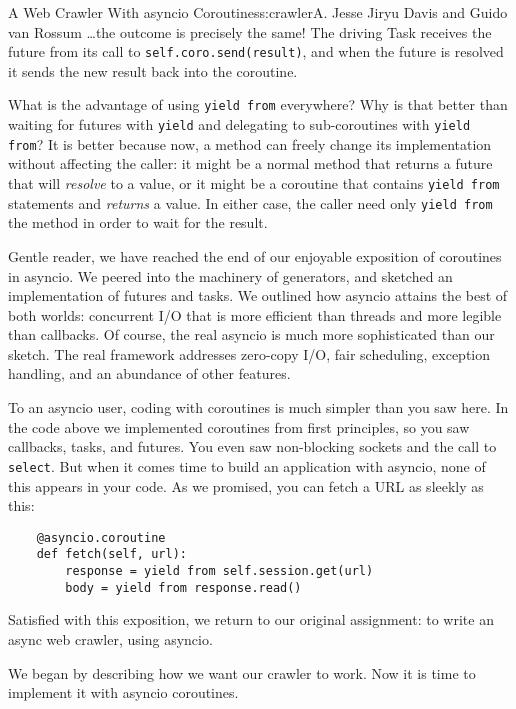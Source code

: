 \begin{aosachapter}{A Web Crawler With asyncio Coroutines}{s:crawler}{A. Jesse Jiryu Davis and Guido van Rossum}
\ldots{}the outcome is precisely the same! The driving Task receives the
future from its call to \texttt{self.coro.send(result)}, and when the
future is resolved it sends the new result back into the coroutine.

What is the advantage of using \texttt{yield from} everywhere? Why is
that better than waiting for futures with \texttt{yield} and delegating
to sub-coroutines with \texttt{yield from}? It is better because now, a
method can freely change its implementation without affecting the
caller: it might be a normal method that returns a future that will
\emph{resolve} to a value, or it might be a coroutine that contains
\texttt{yield from} statements and \emph{returns} a value. In either
case, the caller need only \texttt{yield from} the method in order to
wait for the result.

Gentle reader, we have reached the end of our enjoyable exposition of
coroutines in asyncio. We peered into the machinery of generators, and
sketched an implementation of futures and tasks. We outlined how asyncio
attains the best of both worlds: concurrent I/O that is more efficient
than threads and more legible than callbacks. Of course, the real
asyncio is much more sophisticated than our sketch. The real framework
addresses zero-copy I/O, fair scheduling, exception handling, and an
abundance of other features.

To an asyncio user, coding with coroutines is much simpler than you saw
here. In the code above we implemented coroutines from first principles,
so you saw callbacks, tasks, and futures. You even saw non-blocking
sockets and the call to \texttt{select}. But when it comes time to build
an application with asyncio, none of this appears in your code. As we
promised, you can fetch a URL as sleekly as this:

\begin{verbatim}
    @asyncio.coroutine
    def fetch(self, url):
        response = yield from self.session.get(url)
        body = yield from response.read()
\end{verbatim}

Satisfied with this exposition, we return to our original assignment: to
write an async web crawler, using asyncio.

\label{coordinating-coroutines}

We began by describing how we want our crawler to work. Now it is time
to implement it with asyncio coroutines.


\end{aosachapter}
